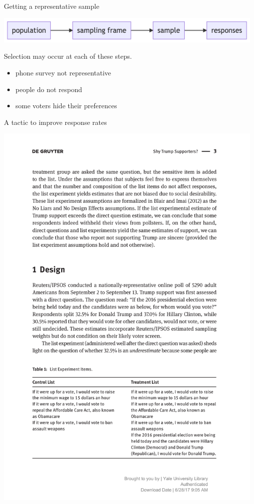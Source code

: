 \documentclass[ignorenonframetext,aspectratio=54,]{beamer}
\providecommand{\tightlist}{%
  \setlength{\itemsep}{0pt}\setlength{\parskip}{0pt}}
\begin{document}
\begin{frame}{Getting a representative sample}
\protect\hypertarget{getting-a-representative-sample}{}

\includegraphics{exhibit/fig/selection-bias.png}

Selection may occur at each of these steps.

\begin{itemize}
\tightlist
\item
  phone survey not representative
\item
  people do not respond
\item
  some voters hide their preferences
\end{itemize}

\end{frame}

\begin{frame}{A tactic to improve response rates}
\protect\hypertarget{a-tactic-to-improve-response-rates}{}

\includegraphics{exhibit/fig/coppock-2017.pdf}

\end{frame}
\end{document}
